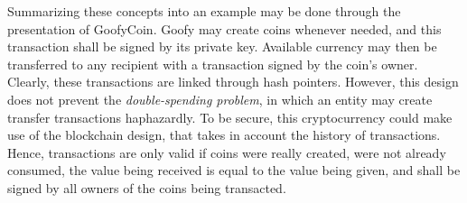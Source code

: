 \documentclass[12pt]{article}
\begin{document}
Summarizing these concepts into an example may be done through the presentation
of GoofyCoin. Goofy may create coins whenever needed, and this transaction
shall be signed by its private key. Available currency may then be transferred
to any recipient with a transaction signed by the coin's owner. Clearly, these
transactions are linked through hash pointers. However, this design does not
prevent the \emph{double-spending problem}, in which an entity may create
transfer transactions haphazardly. To be secure, this cryptocurrency could make
use of the blockchain design, that takes in account the history of
transactions. Hence, transactions are only valid if coins were really created,
were not already consumed, the value being received is equal to the value being
given, and shall be signed by all owners of the coins being transacted.
\end{document}
